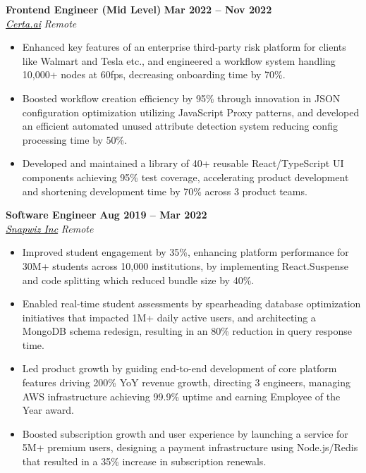 \documentclass[10pt,letterpaper]{article}
\begin{document}
\vspace{1mm}
\hspace{0in}\textbf{Frontend Engineer (Mid Level)} \hfill \textbf{Mar 2022 -- Nov 2022}\\
\hspace{0in}\textit{\href{https://certa.ai}{\textcolor{black}{Certa.ai}}} \hfill \textit{Remote} %
\begin{itemize}[leftmargin=0.15in,nosep,topsep=3pt,itemsep=1mm]
   \item Enhanced key features of an enterprise third-party risk platform for clients like Walmart and Tesla etc., and engineered a workflow system handling 10,000+ nodes at 60fps, decreasing onboarding time by 70\%.
     \item Boosted workflow creation efficiency by 95\% through innovation in JSON configuration optimization utilizing JavaScript Proxy patterns, and developed an efficient automated unused attribute detection system reducing config processing time by 50\%.
   \item Developed and maintained a library of 40+ reusable React/TypeScript UI components achieving 95\% test coverage, accelerating product development and shortening development time by 70\% across 3 product teams.
\end{itemize}

\vspace{1mm}
\hspace{0in}\textbf{Software Engineer} \hfill \textbf{Aug 2019 -- Mar 2022}\\
\hspace{0in}\textit{\href{https://edulastic.com}{\textcolor{black}{Snapwiz Inc}}} \hfill \textit{Remote} %
\begin{itemize}[leftmargin=0.15in,nosep,topsep=3pt,itemsep=1mm]
   \item Improved student engagement by 35\%, enhancing platform performance for 30M+ students across 10,000 institutions, by implementing React.Suspense and code splitting which reduced bundle size by 40\%.
 \item Enabled real-time student assessments by spearheading database optimization initiatives that impacted 1M+ daily active users, and architecting a MongoDB schema redesign, resulting in an 80\% reduction in query response time.
 \item Led product growth by guiding end-to-end development of core platform features driving 200\% YoY revenue growth, directing 3 engineers, managing AWS infrastructure achieving 99.9\% uptime and earning Employee of the Year award.
 \item Boosted subscription growth and user experience by launching a service for 5M+ premium users, designing a payment infrastructure using Node.js/Redis that resulted in a 35\% increase in subscription renewals.
\end{itemize}
\end{document}
